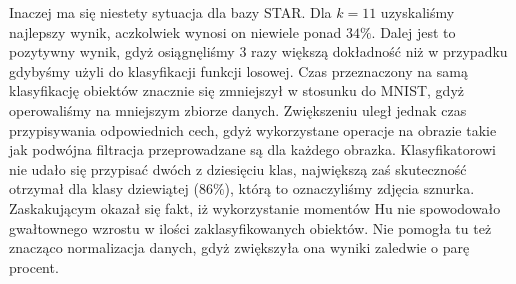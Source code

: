 \documentclass{classrep}
\begin{document}
Inaczej ma się niestety sytuacja dla bazy STAR. Dla $k = 11$ uzyskaliśmy najlepszy wynik, aczkolwiek wynosi on niewiele ponad $34\%$. Dalej jest to pozytywny wynik, gdyż osiągnęliśmy 3 razy większą dokładność niż w przypadku gdybyśmy użyli do klasyfikacji funkcji losowej. Czas przeznaczony na samą klasyfikację obiektów znacznie się zmniejszył w stosunku do MNIST, gdyż operowaliśmy na mniejszym zbiorze danych. Zwiększeniu uległ jednak czas przypisywania odpowiednich cech, gdyż wykorzystane operacje na obrazie takie jak podwójna filtracja przeprowadzane są dla każdego obrazka. Klasyfikatorowi nie udało się przypisać dwóch z dziesięciu klas, największą zaś skuteczność otrzymał dla klasy dziewiątej ($86\%$), którą to oznaczyliśmy zdjęcia sznurka.
Zaskakującym okazał się fakt, iż wykorzystanie momentów Hu nie spowodowało gwałtownego wzrostu w ilości zaklasyfikowanych obiektów. Nie pomogła tu też znacząco normalizacja danych, gdyż zwiększyła ona wyniki zaledwie o parę procent. 
\end{document}
